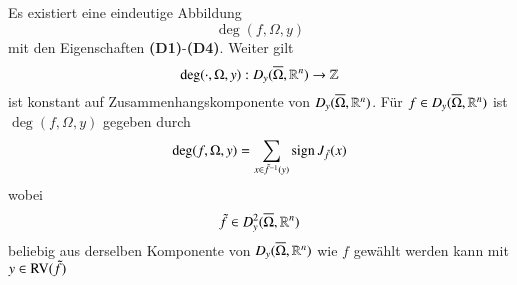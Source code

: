 \begin{theorem}\label{2.11}
    Es existiert eine eindeutige Abbildung
    \[\deg(f,\Omega,y)\]
    mit den Eigenschaften \textbf{(D1)}-\textbf{(D4)}. Weiter gilt
    \[
        \deg(\cdot, \Omega, y): D_y(\overline \Omega, \mathbb{R}^n)\rightarrow \mathbb{Z}
    \]
    ist konstant auf Zusammenhangskomponente von $D_y(\overline \Omega, \mathbb{R}^n)$. Für $f\in D_y(\overline \Omega,\mathbb{R}^n)$
    ist $\deg(f,\Omega,y)$ gegeben durch
    \[
        \deg(f,\Omega,y)=\sum_{x\in \tilde f ^{-1}(y)} \mathrm{sign}\, J_{\tilde f}(x)  
    \]
    wobei
    \[
        \tilde f \in D_y^2(\overline \Omega, \mathbb{R}^n)
    \]
    beliebig aus derselben Komponente von $D_y(\overline \Omega,\mathbb{R}^n)$ wie $f$ gewählt werden kann mit $y
    \in \mathrm{RV}(\tilde f)$
\end{theorem}
